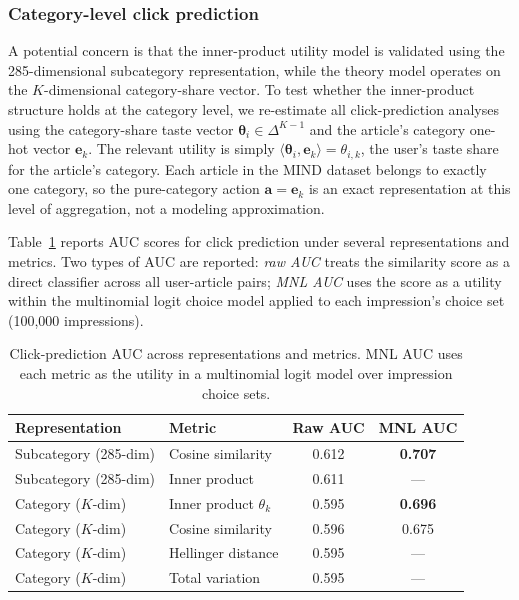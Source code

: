 \documentclass[11pt]{article}
\begin{document}
\subsubsection{Category-level click prediction}
\label{sec:cat_robustness}

A potential concern is that the inner-product utility model is validated using the 285-dimensional subcategory representation, while the theory model operates on the $K$-dimensional category-share vector. To test whether the inner-product structure holds at the category level, we re-estimate all click-prediction analyses using the category-share taste vector $\boldsymbol{\theta}_i \in \Delta^{K-1}$ and the article's category one-hot vector $\mathbf{e}_k$. The relevant utility is simply $\langle \boldsymbol{\theta}_i, \mathbf{e}_k \rangle = \theta_{i,k}$, the user's taste share for the article's category. Each article in the MIND dataset belongs to exactly one category, so the pure-category action $\mathbf{a} = \mathbf{e}_k$ is an exact representation at this level of aggregation, not a modeling approximation.

Table~\ref{tab:cat_auc} reports AUC scores for click prediction under several representations and metrics. Two types of AUC are reported: \emph{raw AUC} treats the similarity score as a direct classifier across all user-article pairs; \emph{MNL AUC} uses the score as a utility within the multinomial logit choice model applied to each impression's choice set (100,000 impressions).

\begin{table}[ht]
\centering
\caption{Click-prediction AUC across representations and metrics. MNL AUC uses each metric as the utility in a multinomial logit model over impression choice sets.}
\label{tab:cat_auc}
\begin{tabular}{llcc}
\toprule
Representation & Metric & Raw AUC & MNL AUC \\
\midrule
Subcategory (285-dim) & Cosine similarity & 0.612 & \textbf{0.707} \\
Subcategory (285-dim) & Inner product & 0.611 & --- \\
\midrule
Category ($K$-dim) & Inner product $\theta_k$ & 0.595 & \textbf{0.696} \\
Category ($K$-dim) & Cosine similarity & 0.596 & 0.675 \\
Category ($K$-dim) & Hellinger distance & 0.595 & --- \\
Category ($K$-dim) & Total variation & 0.595 & --- \\
\bottomrule
\end{tabular}
\end{table}
\FloatBarrier
\end{document}

